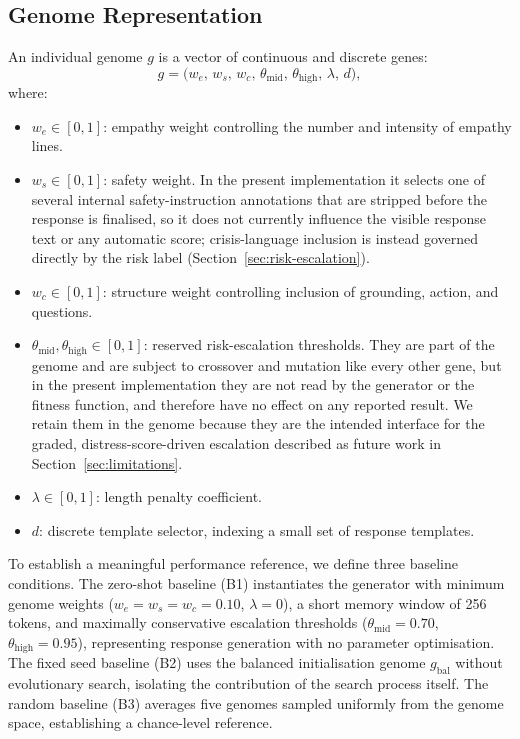 \documentclass[mathematics,article,xetex,moreauthors]{Definitions/mdpi}
\begin{document}
\subsection{Genome Representation}

An individual genome \(g\) is a vector of continuous and discrete genes:
\begin{equation}
\label{eq:genome}
  g = \bigl( w_e,\, w_s,\, w_c,\, \theta_{\mathrm{mid}},\,
             \theta_{\mathrm{high}},\, \lambda,\, d \bigr),
\end{equation}
where:
\begin{itemize}
  \item \(w_e \in [0,1]\): empathy weight controlling the number and intensity
        of empathy lines.
  \item \(w_s \in [0,1]\): safety weight. In the present implementation it
        selects one of several internal safety-instruction annotations that
        are stripped before the response is finalised, so it does not
        currently influence the visible response text or any automatic score;
        crisis-language inclusion is instead governed directly by the risk
        label (Section~\ref{sec:risk-escalation}).
  \item \(w_c \in [0,1]\): structure weight controlling inclusion of grounding,
        action, and questions.
  \item \(\theta_{\mathrm{mid}}, \theta_{\mathrm{high}} \in [0,1]\): reserved
        risk-escalation thresholds. They are part of the genome and are
        subject to crossover and mutation like every other gene, but in the
        present implementation they are not read by the generator or the
        fitness function, and therefore have no effect on any reported result.
        We retain them in the genome because they are the intended interface
        for the graded, distress-score-driven escalation described as future
        work in Section~\ref{sec:limitations}.
  \item \(\lambda \in [0,1]\): length penalty coefficient.
  \item \(d\): discrete template selector, indexing a small set of response
        templates.
\end{itemize}

To establish a meaningful performance reference, we define three baseline
conditions. The zero-shot baseline (B1) instantiates the generator with
minimum genome weights ($w_e = w_s = w_c = 0.10$, $\lambda = 0$), a short
memory window of 256 tokens, and maximally conservative escalation thresholds
($\theta_\mathrm{mid} = 0.70$, $\theta_\mathrm{high} = 0.95$), representing
response generation with no parameter optimisation. The fixed seed baseline
(B2) uses the balanced initialisation genome $g_\mathrm{bal}$ without
evolutionary search, isolating the contribution of the search process itself.
The random baseline (B3) averages five genomes sampled uniformly from the
genome space, establishing a chance-level reference.
\end{document}
